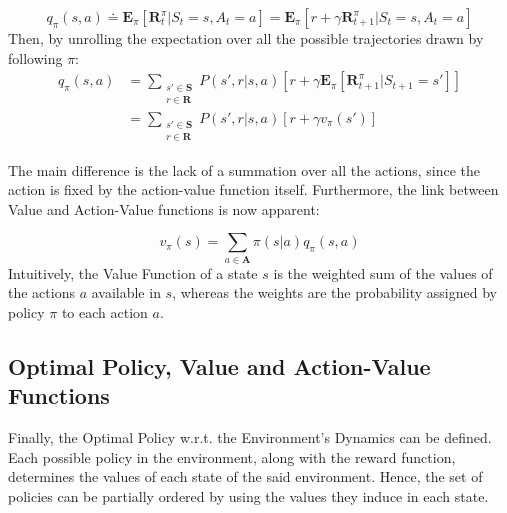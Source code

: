            \begin{definition}
                \label{def:bellmanaction}
                \[ q_{\pi}(s, a) \doteq \mathbf{E}_{\pi} \left[ \mathbf{R}_{t}^{\pi} | S_{t} = s, A_{t} = a\right] =
                    \mathbf{E}_{\pi} \left[ r + \gamma \mathbf{R}_{t+1}^{\pi} | S_{t} = s, A_{t} = a \right] \]
                Then, by unrolling the expectation over all the possible trajectories drawn by following $\pi$:
                \begin{align*}
                    q_{\pi}(s,a) &= \sum_{\substack{s' \in \mathbf{S}\\r \in \mathbf{R}}} P(s', r | s, a)
                                \left[ r + \gamma \mathbf{E}_{\pi} \left[ \mathbf{R}_{t+1}^{\pi} | S_{t+1} = s'\right] \right] \\        
                                 &= \sum_{\substack{s' \in \mathbf{S}\\r \in \mathbf{R}}} P(s', r | s, a)
                                \left[ r + \gamma v_{\pi}(s') \right]
                \end{align*} 
            \end{definition}
            \noindent
            The main difference is the lack of a summation over all the actions, since the action is fixed by the action-value function itself. Furthermore, the link between Value and Action-Value functions is now apparent:
            
            \begin{property}
                \label{prop:linkvq}
                \[ v_{\pi}(s) = \sum_{a \in \mathbf{A}} \pi(s|a) q_{\pi}(s,a)\]
                Intuitively, the Value Function of a state $s$ is the weighted sum of the values of the actions $a$ available in $s$, whereas the weights are the probability assigned by policy $\pi$ to each action $a$.
            \end{property}
            
        \subsection{Optimal Policy, Value and Action-Value Functions}
            \label{subs:opt}
            Finally, the Optimal Policy w.r.t. the Environment's Dynamics can be defined. Each possible policy in the environment, along with the reward function, determines the values of each state of the said environment. Hence, the set of policies can be partially ordered by using the values they induce in each state.
            
